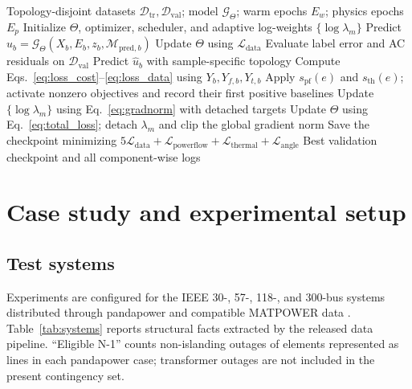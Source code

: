 \documentclass[final,5p,times,twocolumn]{elsarticle}
\begin{document}
\begin{algorithm}[t]
  \caption{Supervised warm start and physics-informed fine-tuning}
  \label{alg:training}
  \begin{algorithmic}[1]
    \REQUIRE Topology-disjoint datasets
      $\mathcal{D}_{\mathrm{tr}},\mathcal{D}_{\mathrm{val}}$;
      model $\mathcal{G}_\Theta$; warm epochs $E_w$; physics epochs $E_p$
    \STATE Initialize $\Theta$, optimizer, scheduler, and adaptive
      log-weights $\{\log\lambda_m\}$
        \STATE Predict $\widehat u_b=\mathcal{G}_\Theta(X_b,E_b,z_b,\mathcal{M}_{\mathrm{pred},b})$
        \STATE Update $\Theta$ using $\mathcal{L}_{\mathrm{data}}$
      \ENDFOR
      \STATE Evaluate label error and AC residuals on $\mathcal{D}_{\mathrm{val}}$
    \ENDFOR
        \STATE Predict $\widehat u_b$ with sample-specific topology
        \STATE Compute Eqs.~\eqref{eq:loss_cost}--\eqref{eq:loss_data}
          using $Y_b,Y_{f,b},Y_{t,b}$
        \STATE Apply $s_{\mathrm{pf}}(e)$ and $s_{\mathrm{th}}(e)$; activate
          nonzero objectives and record their first positive baselines
        \STATE Update $\{\log\lambda_m\}$ using Eq.~\eqref{eq:gradnorm}
          with detached targets
        \STATE Update $\Theta$ using Eq.~\eqref{eq:total_loss};
          detach $\lambda_m$ and clip the global gradient norm
      \ENDFOR
      \STATE Save the checkpoint minimizing
        $5\mathcal L_{\mathrm{data}}+\mathcal L_{\mathrm{powerflow}}
        +\mathcal L_{\mathrm{thermal}}+\mathcal L_{\mathrm{angle}}$
    \ENDFOR
    \RETURN Best validation checkpoint and all component-wise logs
  \end{algorithmic}
\end{algorithm}

\section{Case study and experimental setup}
\label{sec:experiments}

\subsection{Test systems}

Experiments are configured for the IEEE 30-, 57-, 118-, and 300-bus systems
distributed through pandapower and compatible MATPOWER data
\cite{zimmerman2011matpower,thurner2018pandapower}. Table~\ref{tab:systems}
reports structural facts extracted by the released data pipeline. ``Eligible
N-1'' counts non-islanding outages of elements represented as lines in each
pandapower case; transformer outages are not included in the present
contingency set.
\end{document}
